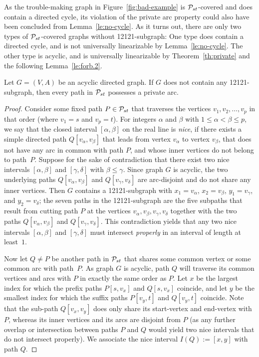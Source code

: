 \documentclass[runningheads]{llncs}
\begin{document}
As the trouble-making graph in Figure~\ref{fig:bad-example} is ${\cal P}_{st}$-covered and 
does contain a directed cycle, its violation of the private arc property could also have 
been concluded from Lemma~\ref{le:no-cycle}.
As it turns out, there are only two types of ${\cal P}_{st}$-covered graphs without 12121-subgraph:
One type does contain a directed cycle, and is not universally linearizable by Lemma~\ref{le:no-cycle}.
The other type is acyclic, and is universally linearizable by Theorem~\ref{th:private} and 
the following Lemma~\ref{le:forb.2}.
\begin{lemma}
\label{le:forb.2}
Let $G=(V,A)$ be an acyclic directed graph.
If $G$ does not contain any 12121-subgraph,
then every path in ${\cal P}_{st}$ possesses a private arc.
\end{lemma}
\begin{proof}
Consider some fixed path $P\in{\cal P}_{st}$ that traverses the vertices $v_1,v_2,\ldots,v_p$ in 
that order (where $v_1=s$ and $v_p=t$).
For integers $\alpha$ and $\beta$ with $1\le\alpha<\beta\le p$, we say that the closed interval 
$[\alpha,\beta]$ on the real line is \emph{nice}, if there exists a simple directed path 
$Q[v_{\alpha},v_{\beta}]$ that leads from vertex $v_{\alpha}$ to vertex $v_{\beta}$, that does 
not have any arc in common with path $P$, and whose inner vertices do not belong to path~$P$.
Suppose for the sake of contradiction that there exist two nice intervals $[\alpha,\beta]$ and $[\gamma,\delta]$ 
with $\beta\le\gamma$.
Since graph $G$ is acyclic, the two underlying paths $Q[v_{\alpha},v_{\beta}]$ and $Q[v_{\gamma},v_{\delta}]$ 
are arc-disjoint and do not share any inner vertices.
Then $G$ contains a 12121-subgraph with $x_1=v_{\alpha}$, $x_2=v_{\beta}$, $y_1=v_{\gamma}$, and $y_2=v_{\delta}$;
the seven paths in the 12121-subgraph are the five subpaths that result from cutting path $P$ 
at the vertices $v_{\alpha},v_{\beta},v_{\gamma},v_{\delta}$ together with the two paths 
$Q[v_{\alpha},v_{\beta}]$ and $Q[v_{\gamma},v_{\delta}]$.
This contradiction yields that any two nice intervals $[\alpha,\beta]$ and $[\gamma,\delta]$ 
must intersect \emph{properly} in an interval of length at least~$1$.

Now let $Q\ne P$ be another path in ${\cal P}_{st}$ that shares some common vertex or some common arc with path~$P$. 
As graph $G$ is acyclic, path $Q$ will traverse its common vertices and arcs with $P$ in exactly 
the same order as $P$.
Let $x$ be the largest  index for which the prefix paths $P[s,v_x]$ and $Q[s,v_x]$ coincide, and
let $y$ be the smallest index for which the suffix paths $P[v_y,t]$ and $Q[v_y,t]$ coincide.
Note that the sub-path $Q[v_x,v_y]$ does only share its start-vertex and end-vertex with $P$, 
whereas its inner vertices and its arcs are disjoint from $P$ (as any further overlap or intersection 
between paths $P$ and $Q$ would yield two nice intervals that do not intersect properly).
We associate the nice interval $I(Q):=[x,y]$ with path $Q$.


\end{proof}
\end{document}
